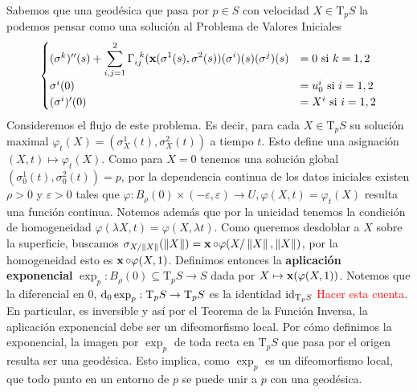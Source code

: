 Sabemos que una geodésica que pasa por $p\in S$ con velocidad $X\in\mathrm{T}_pS$ la podemos pensar como una solución al Problema de Valores Iniciales $$\begin{cases}(\sigma^k)''(s) + \displaystyle\sum_{i,j=1}^2 \Gamma_{ij}^{\;\;k}(\operatorname{\mathbf{x}}(\sigma^1(s),\sigma^2(s))(\sigma^i)(s)(\sigma^j)(s) &= 0 \text{ si }k=1,2\\ \sigma^i(0)&=u_0^i \text{ si }i=1,2\\ (\sigma^i)'(0)&=X^i \text{ si }i=1,2\end{cases}$$ Consideremos el flujo de este problema. Es decir, para cada $X\in\mathrm{T}_pS$ su solución maximal $\varphi_t(X)=(\sigma_X^1(t),\sigma_X^2(t))$ a tiempo $t$. Esto define una asignación $(X,t)\mapsto\varphi_t(X)$. Como para $X=0$ tenemos una solución global $(\sigma_0^1(t),\sigma_0^2(t))=p$, por la dependencia continua de los datos iniciales existen $\rho>0$ y $\varepsilon>0$ tales que ${\varphi: B_\rho(0)\times(-\varepsilon,\varepsilon)\to U, \varphi(X,t)=\varphi_t(X)}$ resulta una función continua. Notemos además que por la unicidad tenemos la condición de homogeneidad $\varphi(\lambda X,t)=\varphi(X,\lambda t)$. Como queremos desdoblar a $X$ sobre la superficie, buscamos $\sigma_{X/\left\| X \right\|}(\left\| X \right\|)=\operatorname{\mathbf{x}}\circ\varphi(X/\left\| X \right\|,\left\| X \right\|)$, por la homogeneidad esto es $\operatorname{\mathbf{x}}\circ\varphi(X,1)$. Definimos entonces la \textbf{aplicación exponencial} $\exp_p: B_\rho(0)\subseteq\mathrm{T}_pS\to S$ dada por $X\mapsto \operatorname{\mathbf{x}}(\varphi(X,1))$. Notemos que la diferencial en $0$, $\mathop{}\!\mathrm{d}_0\exp_p:\mathrm{T}_pS\to\mathrm{T}_pS$ es la identidad $\operatorname{id}_{\mathrm{T}_pS}$ \textcolor{red}{Hacer esta cuenta}. En particular, es inversible y así por el Teorema de la Función Inversa, la aplicación exponencial debe ser un difeomorfismo local. Por cómo definimos la exponencial, la imagen por $\exp_p$ de toda recta en $\mathrm{T}_pS$ que pasa por el origen resulta ser una geodésica. Esto implica, como $\exp_p$ es un difeomorfismo local, que todo punto en un entorno de $p$ se puede unir a $p$ con una geodésica.

